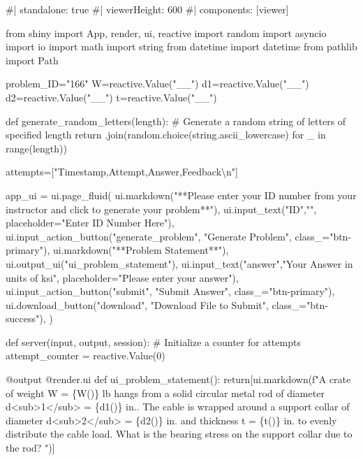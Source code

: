 \documentclass[
  letterpaper,
  DIV=11,
  numbers=noendperiod]{scrreprt}
\newenvironment{Shaded}{\begin{snugshade}}{\end{snugshade}}
\newcommand{\NormalTok}[1]{\textcolor[rgb]{0.00,0.23,0.31}{#1}}
\begin{document}
\begin{Shaded}
\begin{Highlighting}[]
\NormalTok{\#| standalone: true}
\NormalTok{\#| viewerHeight: 600}
\NormalTok{\#| components: [viewer]}

\NormalTok{from shiny import App, render, ui, reactive}
\NormalTok{import random}
\NormalTok{import asyncio}
\NormalTok{import io}
\NormalTok{import math}
\NormalTok{import string}
\NormalTok{from datetime import datetime}
\NormalTok{from pathlib import Path}

\NormalTok{problem\_ID="166"}
\NormalTok{W=reactive.Value("\_\_")}
\NormalTok{d1=reactive.Value("\_\_")}
\NormalTok{d2=reactive.Value("\_\_")}
\NormalTok{t=reactive.Value("\_\_")}

\NormalTok{def generate\_random\_letters(length):}
\NormalTok{    \# Generate a random string of letters of specified length}
\NormalTok{    return \textquotesingle{}\textquotesingle{}.join(random.choice(string.ascii\_lowercase) for \_ in range(length)) }

\NormalTok{attempts=["Timestamp,Attempt,Answer,Feedback\textbackslash{}n"]}

\NormalTok{app\_ui = ui.page\_fluid(}
\NormalTok{    ui.markdown("**Please enter your ID number from your instructor and click to generate your problem**"),}
\NormalTok{    ui.input\_text("ID","", placeholder="Enter ID Number Here"),}
\NormalTok{    ui.input\_action\_button("generate\_problem", "Generate Problem", class\_="btn{-}primary"),}
\NormalTok{    ui.markdown("**Problem Statement**"),}
\NormalTok{    ui.output\_ui("ui\_problem\_statement"),}
\NormalTok{    ui.input\_text("answer","Your Answer in units of ksi", placeholder="Please enter your answer"),}
\NormalTok{    ui.input\_action\_button("submit", "Submit Answer", class\_="btn{-}primary"),}
\NormalTok{    ui.download\_button("download", "Download File to Submit", class\_="btn{-}success"),}
\NormalTok{)}


\NormalTok{def server(input, output, session):}
\NormalTok{    \# Initialize a counter for attempts}
\NormalTok{    attempt\_counter = reactive.Value(0)}

\NormalTok{    @output}
\NormalTok{    @render.ui}
\NormalTok{    def ui\_problem\_statement():}
\NormalTok{        return[ui.markdown(f"A crate of weight W = \{W()\} lb hangs from a solid circular metal rod of diameter d\textless{}sub\textgreater{}1\textless{}/sub\textgreater{} = \{d1()\} in.. The cable is wrapped around a support collar of diameter d\textless{}sub\textgreater{}2\textless{}/sub\textgreater{} = \{d2()\} in. and thickness t = \{t()\} in. to evenly distribute the cable load. What is the bearing stress on the support collar due to the rod? ")]}
    

\end{Highlighting}
\end{Shaded}
\end{document}
